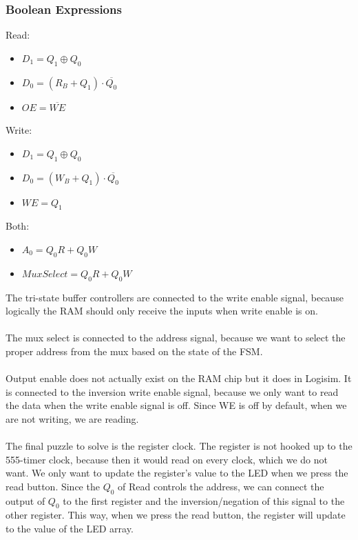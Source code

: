 \documentclass{article}
\begin{document}
        \subsubsection{Boolean Expressions}
        \begin{minipage}{\textwidth}
            \begin{center}
            Read: 
            \begin{itemize}
                \item \( D_1 = Q_1 \oplus Q_0 \)
                \item \( D_0 = (R_B + Q_1) \cdot \overline{Q_0} \)
                \item \( OE = \overline{WE} \)
            \end{itemize}
            Write:
            \begin{itemize}
                \item \( D_1 = Q_1 \oplus Q_0 \)
                \item \( D_0 = (W_B + Q_1) \cdot \overline{Q_0} \)
                \item \( WE = Q_1\)
            \end{itemize}
            Both:
            \begin{itemize}
                \item \( A_0 = Q_0R + Q_0W \)
                \item \( Mux Select =  Q_0R + Q_0W \)
            \end{itemize}


            \end{center}

        The tri-state buffer controllers are connected to the write enable signal, because logically the RAM should only receive the inputs when write enable is on.\\\\
        The mux select is connected to the address signal, because we want to select the proper address from the mux based on the state of the FSM.\\\\
        Output enable does not actually exist on the RAM chip but it does in Logisim. It is connected to the inversion write enable signal, because we only want to read the data when the write enable signal is off.
        Since WE is off by default, when we are not writing, we are reading. \\\\
        The final puzzle to solve is the register clock. The register is not hooked up to the 555-timer clock, because then it would read on every clock, which we do not want. We only want to update the register's value to the LED when we press the read button.
        Since the \(Q_0\) of Read controls the address, we can connect the output of \(Q_0\) to the first register and the inversion/negation of this signal to the other register. This way, when we press the read button, the register will update to the value of the LED array.\\ 
        
        \end{minipage}
\end{document}
